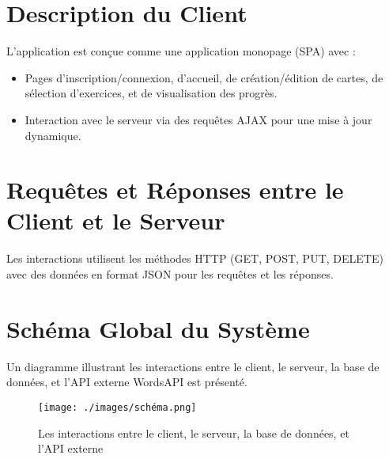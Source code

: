 \documentclass{article}
\begin{document}
	\section{Description du Client}
	L'application est conçue comme une application monopage (SPA) avec :
	\begin{itemize}
		\item Pages d'inscription/connexion, d'accueil, de création/édition de cartes, de sélection d'exercices, et de visualisation des progrès.
		\item Interaction avec le serveur via des requêtes AJAX pour une mise à jour dynamique.
	\end{itemize}
	
	\section{Requêtes et Réponses entre le Client et le Serveur}
	Les interactions utilisent les méthodes HTTP (GET, POST, PUT, DELETE) avec des données en format JSON pour les requêtes et les réponses.
	
	\section{Schéma Global du Système}
	Un diagramme illustrant les interactions entre le client, le serveur, la base de données, et l'API externe WordsAPI est présenté.
	
	\begin{figure}[h]
		\centering
		\texttt{[image: ./images/schéma.png]}
		\caption{Les interactions entre le client, le serveur, la base de données, et l'API externe}
		\label{fig:exemple1}
	\end{figure}
	
\end{document}
